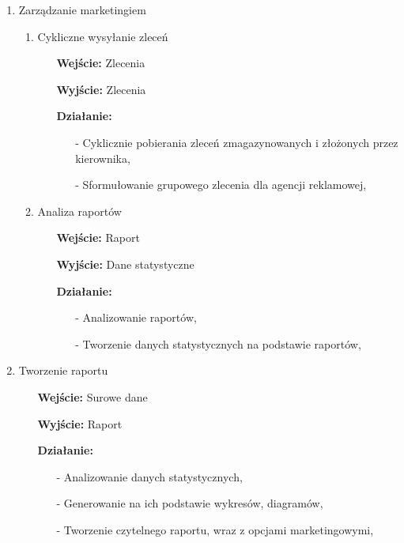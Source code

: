 \documentclass[a4paper, 11pt]{article}
\begin{document}
\begin{enumerate}[label*=\arabic*.]
\begin{enumerate}[label*=\arabic*.]
			\item Zarządzanie marketingiem
			\begin{enumerate}[label*=\arabic*.]
				\item Cykliczne wysyłanie zleceń
				\begin{itemize}
					\item [\textbf{Wejście:}] Zlecenia
					\item [\textbf{Wyjście:}] Zlecenia
					\item [\textbf{Działanie:}] 
					\begin{itemize}
						\item[-] Cyklicznie pobierania zleceń zmagazynowanych i złożonych przez kierownika,
						\item[-] Sformułowanie grupowego zlecenia dla agencji reklamowej,
					\end{itemize}
				\end{itemize}
				\item Analiza raportów
				\begin{itemize}
					\item [\textbf{Wejście:}] Raport
					\item [\textbf{Wyjście:}] Dane statystyczne
					\item [\textbf{Działanie:}] 
					\begin{itemize}
						\item[-] Analizowanie raportów,
						\item[-] Tworzenie danych statystycznych na podstawie raportów,
					\end{itemize}
				\end{itemize}
			\end{enumerate}	
			\item Tworzenie raportu
			\begin{itemize}
				\item [\textbf{Wejście:}] Surowe dane
				\item [\textbf{Wyjście:}] Raport
				\item [\textbf{Działanie:}] 
				\begin{itemize}
					\item[-] Analizowanie danych statystycznych,
					\item[-] Generowanie na ich podstawie wykresów, diagramów,
					\item[-] Tworzenie czytelnego raportu, wraz z opcjami marketingowymi,					
				\end{itemize}
			\end{itemize}
		\end{enumerate}		

\end{enumerate}
\end{document}
